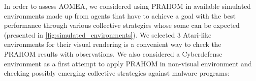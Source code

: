 \documentclass[runningheads]{llncs}
\begin{document}






In order to assess AOMEA, we considered using PRAHOM in available simulated environments made up from agents that have to achieve a goal with the best performance through various collective strategies whose some can be expected (presented in \autoref{fig:simulated_environments}). We selected 3 Atari-like environments for their visual rendering is a convenient way to check the PRAHOM results with observations. We also considered a Cyberdefense environment as a first attempt to apply PRAHOM in non-visual environment and checking possibly emerging collective strategies against malware programs:
\end{document}
